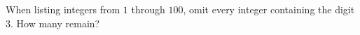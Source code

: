 When listing integers from $1$ through $100$, omit every integer containing the digit $3$. How many remain?

